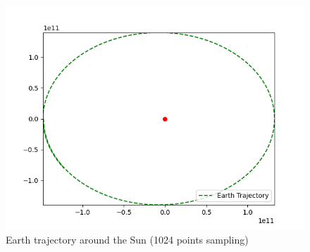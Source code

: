 \begin{figure}[H]
    \center
    \includegraphics[scale=.5]{img/earth_trajectory_test.png}
    \caption{Earth trajectory around the Sun (1024 points sampling)}
\end{figure}